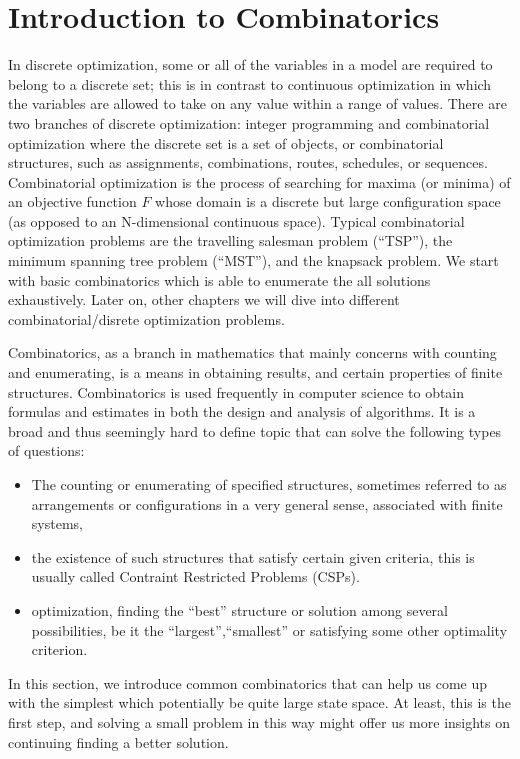 \documentclass[../main.tex]{subfiles}
\begin{document}
\chapter{Introduction to Combinatorics}

In discrete optimization, some or all of the variables in a model are required to belong to a discrete set; 
this is in contrast to continuous optimization in which the variables are allowed to take on any value within a range of values. 
There are two branches of discrete optimization: integer programming and  combinatorial optimization where the discrete set is a set of objects, 
or combinatorial structures, such as assignments, combinations, routes, schedules, or sequences. 
Combinatorial optimization is the process of searching for maxima (or minima) of an objective function $F$ whose domain is a discrete but 
large configuration space (as opposed to an N-dimensional continuous space).  Typical combinatorial optimization problems are the travelling 
salesman problem (``TSP''), the minimum spanning tree problem (``MST''), and the knapsack problem.  
We start with basic combinatorics which is able to enumerate the all solutions exhaustively. 
Later on, other chapters we will dive into different combinatorial/disrete optimization problems.



Combinatorics, as a branch in mathematics that  mainly concerns with counting and enumerating, is a means in obtaining results, and certain properties of finite structures. Combinatorics is used frequently in computer science to obtain formulas and estimates in both the design and analysis of algorithms.  It is a broad and thus seemingly hard to define topic that can solve the following types of questions:
\begin{itemize}
    \item  The counting or enumerating  of specified structures, sometimes referred to as arrangements or 
    configurations in a very general sense, associated with finite systems,
    \item the existence of such structures that satisfy certain given criteria, 
    this is usually called Contraint Restricted Problems (CSPs).
    \item optimization, finding the ``best'' structure or solution among several possibilities, 
    be it the ``largest'',``smallest'' or satisfying some other optimality criterion.
\end{itemize}
In this section, we introduce common combinatorics that can help us come up with the simplest which potentially be quite large state space. At least, this is the first step, and solving a small problem in this way might offer us more insights on continuing finding a better solution.  
\end{document}
